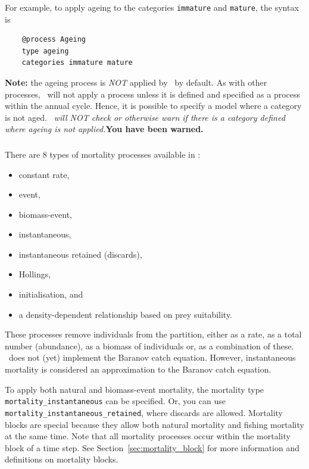 For example, to apply ageing to the categories \texttt{immature} and \texttt{mature}, the syntax is

{\small{\begin{verbatim}
	@process Ageing
	type ageing
	categories immature mature
	\end{verbatim}}}

\textbf{Note:} the ageing process is \emph{NOT} applied by \CNAME~by default. As with other processes, \CNAME~will not apply a process unless it is defined and specified as a process within the annual cycle. Hence, it is possible to specify a model where a category is not aged. \emph{\CNAME~will NOT check or otherwise warn if there is a category defined where ageing is not applied.}\textbf{You have been warned.}

\subsubsection{\label{sec:mortality}}

There are 8 types of mortality processes available in \CNAME:

\begin{itemize}
	\item constant rate,
	\item event,
	\item biomass-event,
	\item instantaneous,
	\item instantaneous retained (discards),
	\item Hollings,
	\item initialisation, and
	\item a density-dependent relationship based on prey suitability.
\end{itemize}

These processes remove individuals from the partition, either as a rate, as a total number (abundance), as a biomass of individuals or, as a combination of these. \CNAME~does not (yet) implement the Baranov catch equation. However, instantaneous mortality is considered an approximation to the Baranov catch equation.

To apply both natural and biomass-event mortality, the mortality type \texttt{mortality\_instantaneous} can be specified. Or, you can use \texttt{mortality\_instantaneous\_retained}, where discards are allowed. Mortality blocks are special because they allow both natural mortality and fishing mortality at the same time. Note that all mortality processes occur within the mortality block of a time step. See Section~\ref{sec:mortality_block} for more information and definitions on mortality blocks.


